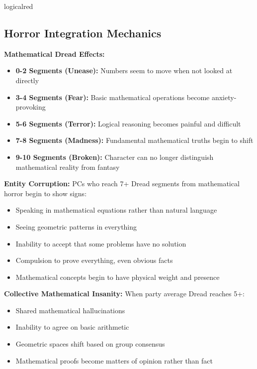 \documentclass[11pt]{article}
\begin{document}
\begin{campaignsection}{logicalred}
\subsection*{Horror Integration Mechanics}

\textbf{Mathematical Dread Effects:}
\begin{itemize}
    \item \textbf{0-2 Segments (Unease):} Numbers seem to move when not looked at directly
    \item \textbf{3-4 Segments (Fear):} Basic mathematical operations become anxiety-provoking
    \item \textbf{5-6 Segments (Terror):} Logical reasoning becomes painful and difficult
    \item \textbf{7-8 Segments (Madness):} Fundamental mathematical truths begin to shift
    \item \textbf{9-10 Segments (Broken):} Character can no longer distinguish mathematical reality from fantasy
\end{itemize}

\textbf{Entity Corruption:} PCs who reach 7+ Dread segments from mathematical horror begin to show signs:
\begin{itemize}
    \item Speaking in mathematical equations rather than natural language
    \item Seeing geometric patterns in everything
    \item Inability to accept that some problems have no solution
    \item Compulsion to prove everything, even obvious facts
    \item Mathematical concepts begin to have physical weight and presence
\end{itemize}

\textbf{Collective Mathematical Insanity:} When party average Dread reaches 5+:
\begin{itemize}
    \item Shared mathematical hallucinations
    \item Inability to agree on basic arithmetic
    \item Geometric spaces shift based on group consensus
    \item Mathematical proofs become matters of opinion rather than fact
\end{itemize}
\end{campaignsection}
\end{document}
